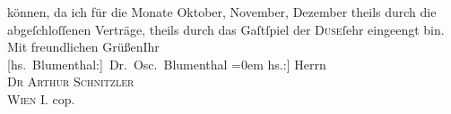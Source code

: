 \begin{ledgroupsized}[t]{13cm}
                    können, da ich für die Monate Oktober, November,
                        Dezember theils durch die abgeſchloſſenen Verträge, theils
                    durch das Gaſtſpiel der \textsc{Duse}ſehr eingeengt bin.\pend
           \pstart
           Mit freundlichen Grüßen\hspace*{2.5em}Ihr{\\[\baselineskip]}\spacefill\mbox{{[}hs. Blumenthal:{]} Dr. Osc. Blumenthal}\pend
           \leftskip=0em{}\pstart
           \noindent{}{[}hs.:{]} Herrn{\\}\textsc{Dr Arthur Schnitzler}{\\}\textsc{Wien I.}\pend
           \pstart
           cop.\pend
           \endnumbering{}\end{ledgroupsized}  \newcommand{\dateiname}{L00110}\newcommand{\titel}{Oscar Blumenthal an Arthur Schnitzler, 1. 8. 1892}\newcommand{\editorInnen}{Martin Anton Müller und Gerd-Hermann Susen}
      